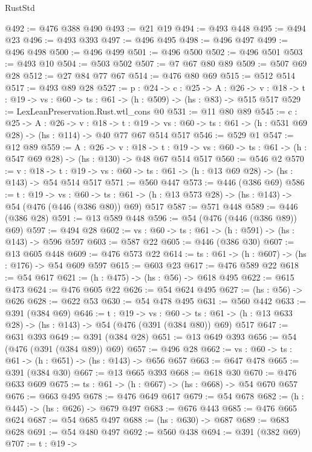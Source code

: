 \begin{lexlean}{RustStd}
\begin{coremodule}
@492 := @476 @388 @490
@493 := @21 @19
@494 := @493 @448
@495 := @494 @23
@496 := @493 @393
@497 := @496 @495
@498 := @496 @497
@499 := @496 @498
@500 := @496 @499
@501 := @496 @500
@502 := @496 @501
@503 := @493 @10
@504 := @503 @502
@507 := @7 @67 @80 @89
@509 := @507 @69 @28
@512 := @27 @84 @77 @67
@514 := @476 @80 @69
@515 := @512 @514
@517 := @493 @89 @28
@527 := {p : @24} ->
  {c : @25} ->
  {A : @26} ->
  {v : @18} -> {t : @19} -> {vs : @60} -> {ts : @61} -> (h : @509) -> (hs : @83) -> @515 @517
@529 := LexLeanPreservation.Rust.wtl_cons @0
@531 := @11 @80 @89
@545 := {c : @25} ->
  {A : @26} ->
  {v : @18} ->
  {t : @19} ->
  {vs : @60} -> {ts : @61} -> (h : @531 @69 @28) -> (hs : @114) -> @40 @77 @67 @514 @517
@546 := @529 @1
@547 := @12 @89
@559 := {A : @26} ->
  {v : @18} ->
  {t : @19} -> {vs : @60} -> {ts : @61} -> (h : @547 @69 @28) -> (hs : @130) -> @48 @67 @514 @517
@560 := @546 @2
@570 := {v : @18} ->
  {t : @19} -> {vs : @60} -> {ts : @61} -> (h : @13 @69 @28) -> (hs : @143) -> @54 @514 @517
@571 := @560 @447
@573 := @446 (@386 @69)
@586 := {t : @19} ->
  {vs : @60} ->
  {ts : @61} -> (h : @13 @573 @28) -> (hs : @143) -> @54 (@476 (@446 (@386 @80)) @69) @517
@587 := @571 @448
@589 := @446 (@386 @28)
@591 := @13 @589 @448
@596 := @54 (@476 (@446 (@386 @89)) @69)
@597 := @494 @28
@602 := {vs : @60} -> {ts : @61} -> (h : @591) -> (hs : @143) -> @596 @597
@603 := @587 @22
@605 := @446 (@386 @30)
@607 := @13 @605 @448
@609 := @476 @573 @22
@614 := {ts : @61} -> (h : @607) -> (hs : @176) -> @54 @609 @597
@615 := @603 @23
@617 := @476 @589 @22
@618 := @54 @617
@621 := (h : @475) -> (hs : @56) -> @618 @495
@622 := @615 @473
@624 := @476 @605 @22
@626 := @54 @624 @495
@627 := (hs : @56) -> @626
@628 := @622 @53
@630 := @54 @478 @495
@631 := @560 @442
@633 := @391 (@384 @69)
@646 := {t : @19} ->
  {vs : @60} ->
  {ts : @61} -> (h : @13 @633 @28) -> (hs : @143) -> @54 (@476 (@391 (@384 @80)) @69) @517
@647 := @631 @393
@649 := @391 (@384 @28)
@651 := @13 @649 @393
@656 := @54 (@476 (@391 (@384 @89)) @69)
@657 := @496 @28
@662 := {vs : @60} -> {ts : @61} -> (h : @651) -> (hs : @143) -> @656 @657
@663 := @647 @478
@665 := @391 (@384 @30)
@667 := @13 @665 @393
@668 := @618 @30
@670 := @476 @633 @609
@675 := {ts : @61} -> (h : @667) -> (hs : @668) -> @54 @670 @657
@676 := @663 @495
@678 := @476 @649 @617
@679 := @54 @678
@682 := (h : @445) -> (hs : @626) -> @679 @497
@683 := @676 @443
@685 := @476 @665 @624
@687 := @54 @685 @497
@688 := (hs : @630) -> @687
@689 := @683 @628
@691 := @54 @480 @497
@692 := @560 @438
@694 := @391 (@382 @69)
@707 := {t : @19} ->

\end{coremodule}
\end{lexlean}
